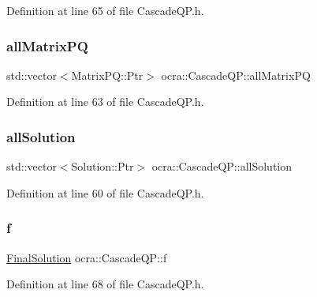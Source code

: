 Definition at line 65 of file Cascade\+Q\+P.\+h.

\hypertarget{classocra_1_1CascadeQP_a9f444092058e2d94da26af59aca9b312}{}\label{classocra_1_1CascadeQP_a9f444092058e2d94da26af59aca9b312} 
\subsubsection{\texorpdfstring{all\+Matrix\+PQ}{allMatrixPQ}}
{\footnotesize\ttfamily std\+::vector$<$Matrix\+P\+Q\+::\+Ptr$>$ ocra\+::\+Cascade\+Q\+P\+::all\+Matrix\+PQ\hspace{0.3cm}{\ttfamily [protected]}}



Definition at line 63 of file Cascade\+Q\+P.\+h.

\hypertarget{classocra_1_1CascadeQP_ae8883fb4a62f072b2216304955e3e0b2}{}\label{classocra_1_1CascadeQP_ae8883fb4a62f072b2216304955e3e0b2} 
\subsubsection{\texorpdfstring{all\+Solution}{allSolution}}
{\footnotesize\ttfamily std\+::vector$<$Solution\+::\+Ptr$>$ ocra\+::\+Cascade\+Q\+P\+::all\+Solution\hspace{0.3cm}{\ttfamily [protected]}}



Definition at line 60 of file Cascade\+Q\+P.\+h.

\hypertarget{classocra_1_1CascadeQP_a0363a53bef69ce85777c3a2ce1c4c251}{}\label{classocra_1_1CascadeQP_a0363a53bef69ce85777c3a2ce1c4c251} 
\subsubsection{\texorpdfstring{f}{f}}
{\footnotesize\ttfamily \hyperlink{structocra_1_1FinalSolution}{Final\+Solution} ocra\+::\+Cascade\+Q\+P\+::f\hspace{0.3cm}{\ttfamily [protected]}}



Definition at line 68 of file Cascade\+Q\+P.\+h.


